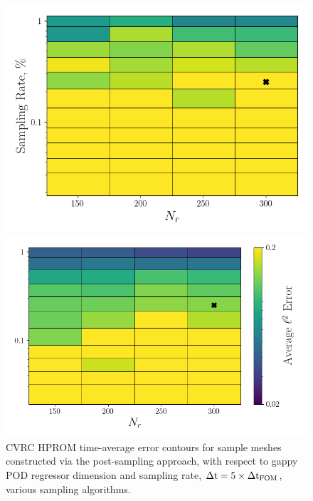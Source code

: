 \begin{figure}
	\begin{minipage}{0.46\linewidth}
		\includegraphics[width=0.99\linewidth]{Chapters/HPROMResults/Images/cvrc/dof_samp/err_contour_gnat1_dof_dt5e-7.png}
	\end{minipage}
	\begin{minipage}{0.53\linewidth}
		\includegraphics[width=0.99\linewidth]{Chapters/HPROMResults/Images/cvrc/dof_samp/err_contour_gnat2_dof_dt5e-7.png}
	\end{minipage}
	\caption{\label{fig:cvrcSampledROMErrContourDOFDt5e-7}CVRC HPROM time-average error contours for sample meshes constructed via the post-sampling approach, with respect to gappy POD regressor dimension and sampling rate, $\Delta \text{t} = 5 \times \Delta \text{t}_{\text{FOM}}$, various sampling algorithms.}
\end{figure}

